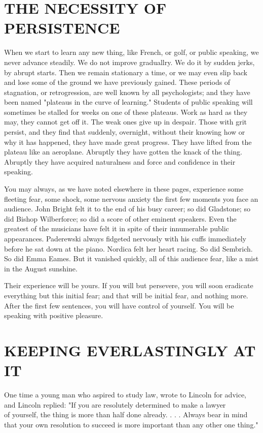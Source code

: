 \documentclass[10pt]{article}
\begin{document}
\section*{THE NECESSITY OF PERSISTENCE}
When we start to learn any new thing, like French, or golf, or public speaking, we never advance steadily. We do not improve graduallry. We do it by sudden jerks, by abrupt starts. Then we remain stationary a time, or we may even slip back and lose some of the ground we have previously gained. These periods of stagnation, or retrogression, are well known by all psychologists; and they have been named "plateaus in the curve of learning." Students of public speaking will sometimes be stalled for weeks on one of these plateaus. Work as hard as they may, they cannot get off it. The weak ones give up in despair. Those with grit\\
persist, and they find that suddenly, overnight, without their knowing how or why it has happened, they have made great progress. They have lifted from the plateau like an aeroplane. Abruptly they have gotten the knack of the thing. Abruptly they have acquired naturalness and force and confidence in their speaking.

You may always, as we have noted elsewhere in these pages, experience some fleeting fear, some shock, some nervous anxiety the first few moments you face an audience. John Bright felt it to the end of his busy career; so did Gladstone; so did Bishop Wilberforce; so did a score of other eminent speakers. Even the greatest of the musicians have felt it in spite of their innumerable public appearances. Paderewski always fidgeted nervously with his cuffs immediately before he sat down at the piano. Nordica felt her heart racing. So did Sembrich. So did Emma Eames. But it vanished quickly, all of this audience fear, like a mist in the August sunshine.

Their experience will be yours. If you will but persevere, you will soon eradicate everything but this initial fear; and that will be initial fear, and nothing more. After the first few sentences, you will have control of yourself. You will be speaking with positive pleasure.

\section*{KEEPING EVERLASTINGLY AT IT}
One time a young man who aspired to study law, wrote to Lincoln for advice, and Lincoln replied: "If you are resolutely determined to make a lawyer\\
of yourself, the thing is more than half done already. . . . Always bear in mind that your own resolution to succeed is more important than any other one thing."
\end{document}
